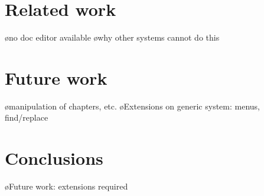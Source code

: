 \documentclass[preprint,natbib]{sigplanconf}
\begin{document}
\section{Related work}

\bl
\o no doc editor available
\o why other systems cannot do this
\el


\section{Future work}

\bl
\o manipulation of chapters, etc.
\o Extensions on generic system: menus, find/replace
\el



\section{Conclusions}

\bl
\o Future work: extensions required
\el







\end{document}
